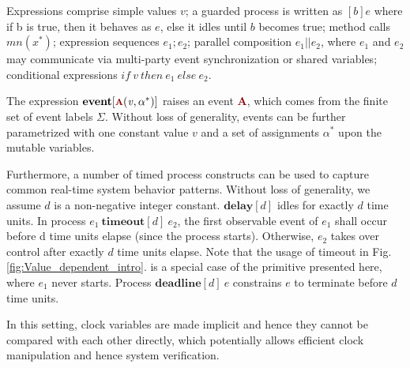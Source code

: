 \documentclass[acmsmall,10pt,review]{acmart}
\newcommand{\anyevent}[1]{{\textcolor{darkred}
{{\textbf{\footnotesize #1}}}}}
\newcommand{\code}[1]{{\tt{\ensuremath{\m{#1}}}}}
\newcommand{\m}{\mathit}
\newcommand\figref[1]{Fig. \textcolor{black}{\ref{#1}}.}
\begin{document}
{Expressions comprise simple values \code{v};
a guarded process is written as \code{[b]e} where if b is true, 
then it behaves as \code{e}, else it idles until \code{b} becomes true; 
method calls \code{mn({x^*})}; 
expression sequences \code{e_1;e_2};
parallel composition \code{e_1 || e_2}, where \code{e_1} and \code{e_2} 
may communicate via multi-party event synchronization or shared variables; 
conditional expressions \code{{if}\ v\ {then}\ e_1\ {else}\ e_2}. 

The expression \code{ \textbf{event} [\anyevent{A}(v,  \alpha^*)] } 
raises an event \anyevent{A}, which comes from the finite 
set of event labels \code{\Sigma}. %
Without loss of generality, events can be further parametrized with 
one constant value \code{v} and a set of assignments \code{\alpha^*} upon 
the mutable variables. %



Furthermore, a number of timed process constructs can be used to capture common 
real-time system behavior patterns. Without loss of generality, we 
assume \code{d} is a non-negative integer constant.  
$\textbf{delay} [d]$ idles for exactly $d$ 
time units.
 In process $e_1\ \textbf{timeout} [d]\ e_2$, the first observable event of 
$e_1$ shall occur before d time units elapse (since the process starts). 
Otherwise, $e_2$ takes over control after exactly $d$ time units elapse. 
Note that the usage of timeout in \figref{fig:Value_dependent_intro} is a 
special case of the primitive presented here, where \code{e_1} never starts. 
Process $\textbf{deadline} [d]\ e$ constrains $e$ to terminate before $d$ time units. 


In this setting, clock variables are 
made implicit and hence they cannot be compared with each other 
directly, which potentially allows efficient clock manipulation and 
hence system verification.


}
\end{document}

